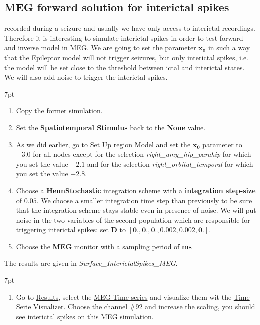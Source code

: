 \documentclass{tufte-handout}
\newenvironment{simulation}{%
  \def\FrameCommand{%
    \hspace{1pt}%
    {\color{ForestGreen}\vrule width 2pt}%
    {\color{simulationshade}\vrule width 4pt}%
    \colorbox{simulationshade}%
  }%
  \MakeFramed{\advance\hsize-\width\FrameRestore}%
  \noindent\hspace{-4.55pt}%
  \begin{adjustwidth}{}{7pt}%
  \vspace{2pt}\vspace{2pt}%
}
{%
  \vspace{2pt}\end{adjustwidth}\endMakeFramed%
}
\begin{document}
\subsection{MEG forward solution for interictal spikes}

 recorded during a seizure and usually we have only access to interictal recordings.
Therefore it is interesting to simulate interictal spikes in order to test forward and inverse model in MEG.
We are going to set the parameter $\mathbf{x_0}$ in such a way that the Epileptor model will not trigger seizures, but only interictal spikes, 
i.e. the model will be set close to the threshold between ictal and interictal states. 
We will also add noise to trigger the interictal spikes.

  \begin{simulation}
  \begin{enumerate}
  \item Copy the former simulation.
  \item Set the \textbf{Spatiotemporal Stimulus} back to the \textbf{None} value.
  \item As we did earlier, go to \underline{Set Up region Model} and set the $\mathbf{x_0}$ parameter to $\mathbf{-3.0}$ for all 
  nodes except for the selection \textit{right\_amy\_hip\_parahip} for which you set the value $\mathbf{-2.1}$ and for the selection
  \textit{right\_orbital\_temporal} for which you set the value $\mathbf{-2.8}$.
  \item Choose a \textbf{HeunStochastic} integration scheme with a \textbf{integration step-size} of $\mathbf{0.05}$. We choose
  a smaller integration time step than previously to be sure that  the integration scheme stays stable even in presence of noise.
  We will put noise in the two variables of the second population which are responsible for triggering interictal spikes:
  set $\mathbf{D}$ to $\mathbf{[0., 0., 0., 0.002, 0.002, 0.]}$.
  \item Choose the \textbf{MEG} monitor with a sampling period of \textbf{\unit[1]{ms}}
\end{enumerate}
\end{simulation}

The results are given in \textit{Surface\_InterictalSpikes\_MEG}.

  \begin{simulation}
  \begin{enumerate}
  \item Go to \underline{Results}, select the \underline{MEG Time series} and visualize them wit the \underline{Time Serie Visualizer}.
  Choose the \underline{channel} $\#92$ and increase the \underline{scaling}, you should see interictal spikes on this MEG simulation.
\end{enumerate}
\end{simulation}
\end{document}
